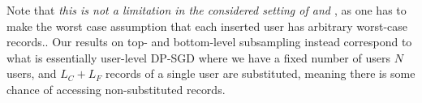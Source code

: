 Note that \emph{this is not a limitation in the considered setting of \citet{charles2024fine} and \cite{chua2024mind}}, as one has to make the worst case assumption that each inserted user has arbitrary worst-case records..
Our results on top- and bottom-level subsampling instead correspond to what is essentially user-level DP-SGD where we have a fixed number of users $N$ users, and $L_C + L_F$ records of a single user are substituted, meaning there is some chance of accessing non-substituted records.